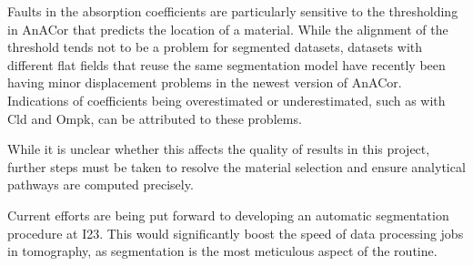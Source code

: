 Faults in the absorption coefficients are particularly sensitive to the thresholding in AnACor that predicts the location of a material. While the alignment of the threshold tends not to be a problem for segmented datasets, datasets with different flat fields that reuse the same segmentation model have recently been having minor displacement problems in the newest version of AnACor. Indications of coefficients being overestimated or underestimated, such as with Cld and Ompk, can be attributed to these problems.  

While it is unclear whether this affects the quality of results in this project, further steps must be taken to resolve the material selection and ensure analytical pathways are computed precisely.

Current efforts are being put forward to developing an automatic segmentation procedure at I23. This would significantly boost the speed of data processing jobs in tomography, as segmentation is the most meticulous aspect of the routine.



